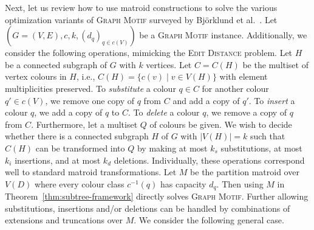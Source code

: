 \documentclass[10pt,a4paper]{article}
\begin{document}
Next, let us review how to use matroid constructions to solve the various
optimization variants of \textsc{Graph Motif} surveyed by Björklund
et al.~\cite{BjorklundKK16}. Let $(G=(V,E), c, k, (d_q)_{q \in c(V)})$
be a \textsc{Graph Motif} instance. Additionally, we consider the
following operations, mimicking the \textsc{Edit Distance} problem.
Let $H$ be a connected subgraph of $G$ with $k$ vertices.
Let $C=C(H)$ be the multiset of vertex colours in $H$, i.e.,
$C(H)=\{c(v) \mid v \in V(H)\}$ with element multiplicities preserved.
To \emph{substitute} a colour $q \in C$ for another colour $q' \in c(V)$,
we remove one copy of $q$ from $C$ and add a copy of $q'$.
To \emph{insert} a colour $q$, we add a copy of $q$ to $C$.
To \emph{delete} a colour $q$, we remove a copy of $q$ from $C$.
Furthermore, let a multiset $Q$ of colours be given. We wish to decide
whether there is a connected subgraph $H$ of $G$ with $|V(H)|=k$
such that $C(H)$ can be transformed into $Q$
by making at most $k_s$ substitutions, at most $k_i$ insertions,
and at most $k_d$ deletions.
Individually, these operations correspond well to standard matroid
transformations. Let $M$ be the partition matroid over $V(D)$ where
every colour class $c^{-1}(q)$ has capacity $d_q$.
Then using $M$ in Theorem~\ref{thm:subtree-framework} directly solves
\textsc{Graph Motif}. Further allowing substitutions, insertions
and/or deletions can be handled by combinations of extensions and
truncations over $M$. We consider the following general case.
\end{document}
